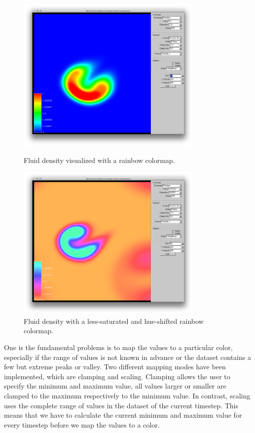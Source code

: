 \begin{figure}[htbp]
\centering
\begin{minipage}[t]{0.48\textwidth}
        \includegraphics[height=3in]{figures/colormaps/rainbowSmoke.png}
\caption{Fluid density visualized with a rainbow colormap.}
\label{fig:rainbowColormap}
\end{minipage}\hspace{.04\textwidth}%
\begin{minipage}[t]{0.48\textwidth}
        \includegraphics[height=3in]{figures/colormaps/hueAndSaturation.png}
    \caption{Fluid density with a less-saturated and hue-shifted rainbow colormap.}
    \label{fig:saturationAndHueColormap}
\end{minipage}
\end{figure}


One is the fundamental problems is to map the values to a particular color, especially if the range of values is not known in advance or the dataset contains a few but extreme peaks or valley. Two different mapping modes have been implemented, which are clamping and scaling. Clamping allows the user to specify the minimum and maximum value, all values larger or smaller are clamped to the maximum respectively to the minimum value. 
In contrast, scaling uses the complete range of values in the dataset of the current timestep. This means that we have to calculate the current minimum and maximum value for every timestep before we map the values to a color.

